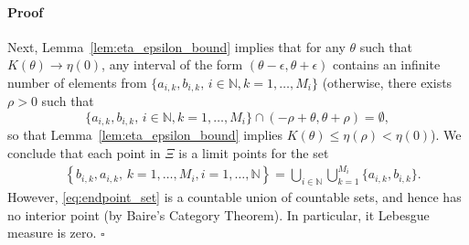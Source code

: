 \documentclass[letterpaper, 10pt]{IEEEtran}      %
\newenvironment{proof}{\paragraph*{Proof}}{\hfill$\square$ \newline}
\begin{document}
\begin{proof}
\begin{equation}
\end{equation}
Next, Lemma~\ref{lem:eta_epsilon_bound} implies that for any $\theta$ such that $K(\theta) \to \eta(0)$, any interval of the form $(\theta-\epsilon,\theta+\epsilon)$ contains an infinite number of elements from $\{ a_{i,k},b_{i,k},\, i\in \mathbb N, k = 1,\ldots,M_i \}$ (otherwise, there exists $\rho>0$ such that 
\[
\{ a_{i,k},b_{i,k},\, i\in \mathbb N, k = 1,\ldots,M_i \} \cap (-\rho+\theta,\theta+\rho) = \emptyset,
\]
so that Lemma~\ref{lem:eta_epsilon_bound} implies $K(\theta) \leq \eta(\rho) < \eta(0)$). We conclude that each point in $\Xi$ is a limit points for the set 
\begin{align}
\label{eq:endpoint_set}
& \left\{b_{i,k},a_{i,k},\, k=1,\ldots,M_i,i=1,\ldots, \mathbb N  \right\} = \bigcup_{i\in \mathbb N} \bigcup_{k=1}^{M_i} \{ a_{i,k},b_{i,k}\}. 
\end{align}
However, \eqref{eq:endpoint_set} is a countable union of countable sets, and hence has no interior point (by Baire's Category Theorem). In particular, it Lebesgue measure is zero. 
\end{proof}
\end{document}
